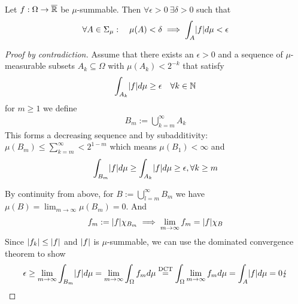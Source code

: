 \begin{thm}[] \label{thm:absolute-continuity}
Let $f: \Omega \to \overline{\mathbb{R}}$ be $\mu$-summable. Then $\forall \epsilon > 0\  \exists \delta > 0$ such that
\begin{align*}
  \forall A \in \Sigma_{\mu}: \quad \mu(A) < \delta \implies \int_{A} \abs{f} d \mu < \epsilon
\end{align*}
\end{thm}
\begin{proof}[Proof by contradiction]
  Assume that there exists an $\epsilon > 0$ and a sequence of $\mu$-measurable subsets $A_k \subseteq \Omega$ with $\mu(A_k) < 2^{-k}$ that satisfy
  \begin{align*}
    \int_{A_k} \abs{f} d \mu \geq \epsilon \quad \forall k \in \N
  \end{align*}
  for $m \geq 1$ we define
  \begin{align*}
    B_m := \bigcup_{k=m}^{\infty}A_k
  \end{align*}
  This forms a decreasing sequence and by subadditivity: $\mu(B_m) \leq \sum_{k=m}^{\infty} < 2^{1-m}$ which means $\mu(B_1) < \infty$ and
  \begin{align*}
    \int_{B_m} \abs{f} d \mu \geq \int_{A_k} \abs{f} d \mu \geq \epsilon, \forall  k \geq m
  \end{align*}

  By continuity from above, for $B := \bigcup_{l=m}^{\infty}B_m$ we have $\mu(B) = \lim_{m \to \infty} \mu(B_m) = 0$.
  And 
  \begin{align*}
    f_m := \vert f\vert \chi_{B_m} \implies \lim_{m \to \infty} f_m = \vert f\vert\chi_{B}
  \end{align*}
  Since $\vert f_k\vert \leq \vert f\vert$ and $\vert f\vert$ is $\mu$-summable, we can use the dominated convergence theorem to show
  \begin{align*}
    \epsilon \geq \lim_{m \to \infty} \int_{B_m} \abs{f} d \mu = \lim_{m \to \infty} \int_{\Omega} f_m d \mu \stackrel{\text{DCT}}{=} \int_{\Omega} \lim_{m \to \infty} f_m d \mu = \int_{A} \abs{f} d \mu = 0 \lightning
  \end{align*}
\end{proof}


